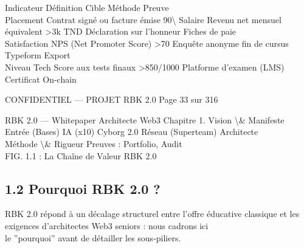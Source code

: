 Indicateur     Définition                         Cible     Méthode                         Preuve\\
Placement      Contrat signé ou facture émise     90\textbackslash{}%
Salaire        Revenu net mensuel équivalent     \textgreater{}3k TND    Déclaration sur l’honneur       Fiches de paie\\
Satisfaction   NPS (Net Promoter Score)           \textgreater{}70       Enquête anonyme fin de cursus   Typeform Export\\
Niveau Tech    Score aux tests finaux           \textgreater{}850/1000   Platforme d’examen (LMS)        Certificat On-chain\\
\vspace{0.5em}
\vspace{0.5em}
\vspace{0.5em}
\vspace{0.5em}
\begin{confidential}CONFIDENTIEL — PROJET RBK 2.0                                  Page 33 sur 316\end{confidential}
RBK 2.0 — Whitepaper Architecte Web3                                                                                    Chapitre 1. Vision \textbackslash{}& Manifeste\\
\vspace{0.5em}
\vspace{0.5em}
Entrée (Bases)      IA (x10)        Cyborg 2.0       Réseau (Superteam)     Architecte\\
Méthode \textbackslash{}& Rigueur                    Preuves : Portfolio, Audit\\
\vspace{0.5em}
FIG. 1.1 : La Chaîne de Valeur RBK 2.0\\
\vspace{0.5em}
\vspace{0.5em}
\vspace{0.5em}
\subsection{1.2 Pourquoi RBK 2.0 ?}
RBK 2.0 répond à un décalage structurel entre l’offre éducative classique et les exigences d’architectes Web3 seniors : nous cadrons ici\\
le ”pourquoi” avant de détailler les sous-piliers.\\
\vspace{0.5em}
